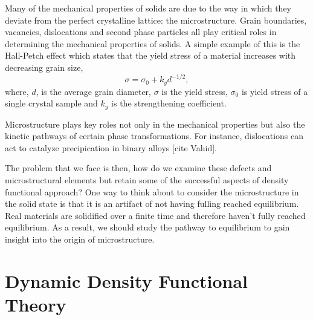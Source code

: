 Many of the mechanical properties of solids are due to the way in which they
deviate from the perfect crystalline lattice: the microstructure. Grain
boundaries, vacancies, dislocations and second phase particles all play
critical roles in determining the mechanical properties of solids. A simple
example of this is the Hall-Petch effect which states that the yield stress of
a material increases with decreasing grain size,
%
\begin{equation}
    \sigma = \sigma_0 + k_y d^{-1/2},
\end{equation}
%
where, $d$, is the average grain diameter, $\sigma$ is the yield stress,
$\sigma_0$ is yield stress of a single crystal sample and $k_y$ is the
strengthening coefficient.

Microstructure plays key roles not only in the mechanical properties but also
the kinetic pathways of certain phase transformations. For instance,
dislocations can act to catalyze precipication in binary alloys [cite Vahid].

The problem that we face is then, how do we examine these defects and
microstructural elements but retain some of the successful aspects of density
functional approach? One way to think about to consider the microstructure in
the solid state is that it is an artifact of not having fulling reached
equilibrium. Real materials are solidified over a finite time and therefore
haven't fully reached equilibrium. As a result, we should study the pathway to 
equilibrium to gain insight into the origin of microstructure. 

\section{Dynamic Density Functional Theory} %

